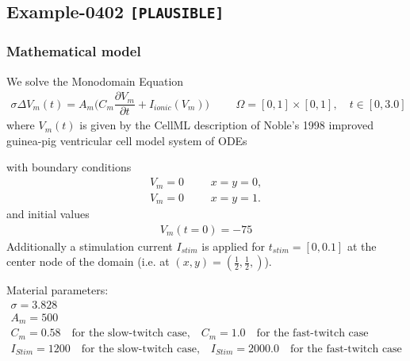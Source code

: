 %
\clearpage
%
\subsection{Example-0402 \texttt{[PLAUSIBLE]}}
%
%
\subsubsection{Mathematical model}
%
We solve the Monodomain Equation
%
\begin{align}
    \sigma \Delta V_m(t) = A_m\Big(C_m \dfrac{\partial V_m}{\partial t} + I_{ionic}(V_m)\Big) & &&\Omega = [0, 1] \times [0, 1], \quad t \in [0, 3.0]
\end{align}
%
where $V_m(t)$ is given by the CellML description of Noble's 1998 improved
guinea-pig ventricular cell model system of ODEs \cite{noble1998improved}

with boundary conditions
%
\begin{align}
    V_m = 0 & &&x = y = 0, \\
    V_m = 0 & &&x = y = 1.
\end{align}
and initial values 
%
\begin{equation*}
  \begin{array}{lll}
    V_m(t=0) = -75
  \end{array}
\end{equation*}
%
Additionally a stimulation current $I_{stim}$ is applied for $t_{stim} = [0, 0.1]$ at the center node of the domain (i.e. at $(x,y) = (\frac12, \frac12,)$).
%

Material parameters:
\begin{equation*}
  \begin{array}{lll}
    \sigma = 3.828\\[4mm]
    A_m = 500\\[4mm]
    C_m = 0.58 \quad \text{for the slow-twitch case,} \quad C_m = 1.0 \quad \text{for the fast-twitch case}\\[4mm]
    I_{Stim} = 1200 \quad \text{for the slow-twitch case,} \quad I_{Stim} = 2000.0 \quad \text{for the fast-twitch case}\\[4mm]    
  \end{array}
\end{equation*}
%
%
